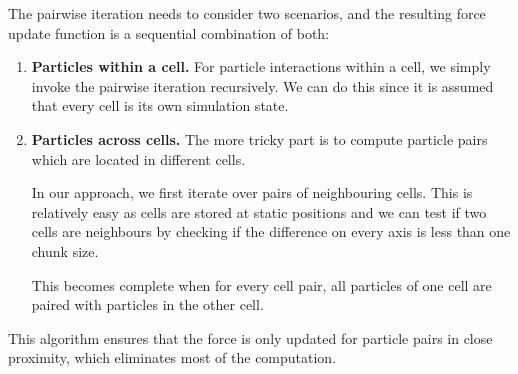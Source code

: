 \documentclass[11pt,
               a4paper,
               bibtotoc,
               idxtotoc,
               headsepline,
               footsepline,
               footexclude,
               BCOR12mm,
               DIV13,
               openany,   %
               ]
               {scrbook}
\begin{document}
The pairwise iteration needs to consider two scenarios, and the resulting force update function is a sequential combination of both:

\begin{enumerate}
    \item \textbf{Particles within a cell.} For particle interactions within a cell, we simply invoke the pairwise iteration recursively. We can do this since it is assumed that every cell is its own simulation state.
    \item \textbf{Particles across cells.} The more tricky part is to compute particle pairs which are located in different cells.
    
    In our approach, we first iterate over pairs of neighbouring cells. This is relatively easy as cells are stored at static positions and we can test if two cells are neighbours by checking if the difference on every axis is less than one chunk size.

    This becomes complete when for every cell pair, all particles of one cell are paired with particles in the other cell.
\end{enumerate}

This algorithm ensures that the force is only updated for particle pairs in close proximity, which eliminates most of the computation.






                
\end{document}
